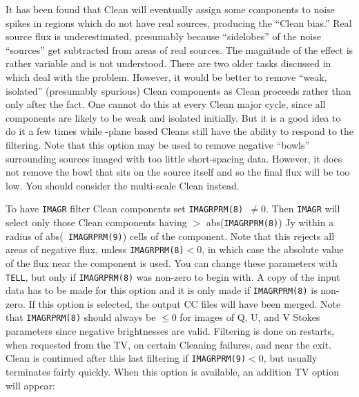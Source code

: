 
     It has been found that Clean will eventually assign some
components to noise spikes in regions which do not have real sources,
producing the ``Clean bias.''  Real source flux is underestimated,
presumably because ``sidelobes'' of the noise ``sources'' get
subtracted from areas of real sources.  The magnitude of the effect is
rather variable and is not understood.  There are two older tasks
discussed in  which deal with the problem.  However, it
would be better to remove ``weak, isolated'' (presumably spurious)
Clean components as Clean proceeds rather than only after the fact.
One cannot do this at every Clean major cycle, since all components
are likely to be weak and isolated initially.  But it is a good idea
to do it a few times while \uv-plane based Cleans still have the
ability to respond to the filtering.  Note that this option may be
used to remove negative ``bowls'' surrounding sources imaged with too
little short-spacing data.  However, it does not remove the bowl that
sits on the source itself and so the final flux will be too low.  You
should consider the multi-scale Clean instead.

     To have {\tt IMAGR} filter Clean components set {\tt IMAGRPRM(8)
$\neq 0$}.  Then {\tt IMAGR} will select only those Clean components
having $>$ abs({\tt IMAGRPRM(8)}) Jy within a radius of abs({\tt
IMAGRPRM(9)}) cells of the component.  Note that this rejects all areas
of negative flux, unless {\tt IMAGRPRM(8)}$< 0$, in which case the
absolute value of the flux near the component is used.  You can change
these parameters with {\tt TELL}, but only if {\tt IMAGRPRM(8)} was
non-zero to begin with.  A copy of the input data has to be made for
this option and it is only made if {\tt IMAGRPRM(8)} is non-zero.  If
this option is selected, the output CC files will have been merged.
Note that {\tt IMAGRPRM(8)} should always be $\leq 0$ for images of Q,
U, and V Stokes parameters since negative brightnesses are valid.
Filtering is done on restarts, when requested from the TV, on certain
Cleaning failures, and near the exit.  Clean is continued after this
last filtering if {\tt IMAGRPRM(9)}$ < 0$, but usually terminates
fairly quickly.  When this option is available, an addition TV option
will appear:

